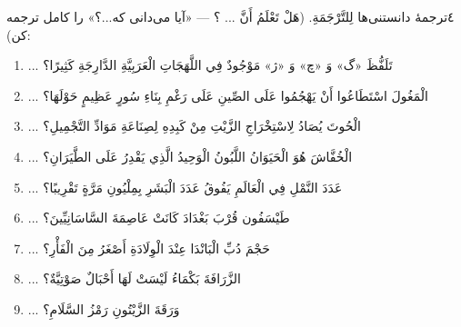 \begin{JTamrin}{٤}{ترجمهٔ دانستنی‌ها}
لِلتَّرْجَمَةِ. (هَلْ تَعْلَمُ أَنَّ ... ؟ — «آیا می‌دانی که...؟» را کامل
ترجمه کن):

\begin{enumerate}
  \item ... تَلَفُّظَ «گ» وَ «چ» وَ «ژ» مَوْجُودٌ فِي اللَّهَجَاتِ
        الْعَرَبِيَّةِ الدَّارِجَةِ كَثِيرًا؟ \Jdots
  \item ... الْمَغُولَ اسْتَطَاعُوا أَنْ يَهْجُمُوا عَلَى الصِّينِ عَلَى
        رَغْمِ بِنَاءِ سُورٍ عَظِيمٍ حَوْلَهَا؟ \Jdots
  \item ... الْحُوتَ يُصَادُ لِاسْتِخْرَاجِ الزَّيْتِ مِنْ كَبِدِهِ لِصِنَاعَةِ
        مَوَادِّ التَّجْمِيلِ؟ \Jdots
  \item ... الْخُفَّاشَ هُوَ الْحَيَوَانُ اللَّبُونُ الْوَحِيدُ الَّذِي
        يَقْدِرُ عَلَى الطَّيَرَانِ؟ \Jdots
  \item ... عَدَدَ النَّمْلِ فِي الْعَالَمِ يَفُوقُ عَدَدَ الْبَشَرِ بِمِلْيُونِ
        مَرَّةٍ تَقْرِيبًا؟ \Jdots
  \item ... طَيْسَفُون قُرْبَ بَغْدَادَ كَانَتْ عَاصِمَةَ
        السَّاسَانِيِّينَ؟ \Jdots
  \item ... حَجْمَ دُبِّ الْبَانْدَا عِنْدَ الْوِلَادَةِ أَصْغَرُ
        مِنَ الْفَأْرِ؟ \Jdots {}
  \item ... الزَّرَافَةَ بَكْمَاءُ لَيْسَتْ لَهَا أَحْبَالٌ
        صَوْتِيَّةٌ؟ \Jdots
  \item ... وَرَقَةَ الزَّيْتُونِ رَمْزُ السَّلَامِ؟ \Jdots
\end{enumerate}
\end{JTamrin}


